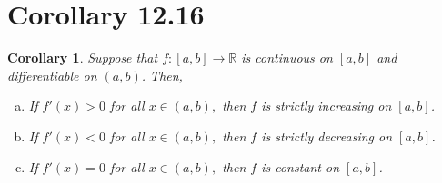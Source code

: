 \documentclass[openany, amssymb, psamsfonts]{amsart}
\newcommand{\bbR}{\mathbb{R}}
\newtheorem{cor}{Corollary}[section]
\theoremstyle{definition}
\numberwithin{equation}{section}
\begin{document}
\section*{Corollary 12.16}
\begin{cor}
	\label{12.16}
	Suppose that $f\colon [a, b] \to \bbR$ is continuous on $[a, b]$ and differentiable on $(a, b)$. Then,
	\begin{enumerate}[(a)]
		\item If $f'(x)>0$ for all $x \in (a, b), $ then $f$ is strictly increasing on $[a, b]$.
		\item If $f'(x)<0$ for all $x \in (a, b), $ then $f$ is strictly decreasing on $[a, b]$.
		\item If $f'(x) = 0$ for all $x \in (a, b), $ then $f$ is constant on $[a, b]$.
	\end{enumerate}
\end{cor}
\end{document}
